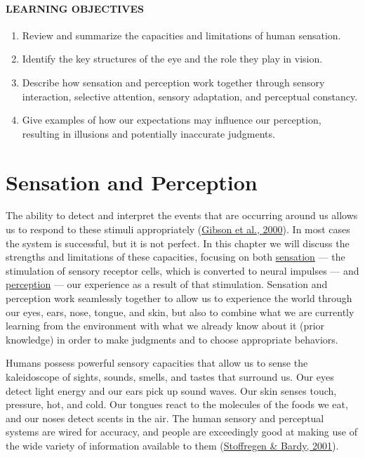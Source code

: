 \documentclass[
]{krantz}
\providecommand{\tightlist}{%
  \setlength{\itemsep}{0pt}\setlength{\parskip}{0pt}}
\begin{document}
\hypertarget{learning-objectives-1}{%
\paragraph*{LEARNING OBJECTIVES}\label{learning-objectives-1}}

\begin{enumerate}
\def\labelenumi{\arabic{enumi}.}
\tightlist
\item
  Review and summarize the capacities and limitations of human sensation.
\item
  Identify the key structures of the eye and the role they play in vision.
\item
  Describe how sensation and perception work together through sensory interaction, selective attention, sensory adaptation, and perceptual constancy.
\item
  Give examples of how our expectations may influence our perception, resulting in illusions and potentially inaccurate judgments.
\end{enumerate}

\hypertarget{sensation-and-perception}{%
\section{Sensation and Perception}\label{sensation-and-perception}}

The ability to detect and interpret the events that are occurring around us allows us to respond to these stimuli appropriately (\protect\hyperlink{ref-Gibson2000}{Gibson et al., 2000}). In most cases the system is successful, but it is not perfect. In this chapter we will discuss the strengths and limitations of these capacities, focusing on both \protect\hyperlink{sensation}{sensation} --- the stimulation of sensory receptor cells, which is converted to neural impulses --- and \protect\hyperlink{perception-1}{perception} --- our experience as a result of that stimulation. Sensation and perception work seamlessly together to allow us to experience the world through our eyes, ears, nose, tongue, and skin, but also to combine what we are currently learning from the environment with what we already know about it (prior knowledge) in order to make judgments and to choose appropriate behaviors.

Humans possess powerful sensory capacities that allow us to sense the kaleidoscope of sights, sounds, smells, and tastes that surround us. Our eyes detect light energy and our ears pick up sound waves. Our skin senses touch, pressure, hot, and cold. Our tongues react to the molecules of the foods we eat, and our noses detect scents in the air. The human sensory and perceptual systems are wired for accuracy, and people are exceedingly good at making use of the wide variety of information available to them (\protect\hyperlink{ref-Stoffregen2001}{Stoffregen \& Bardy, 2001}).
\end{document}
